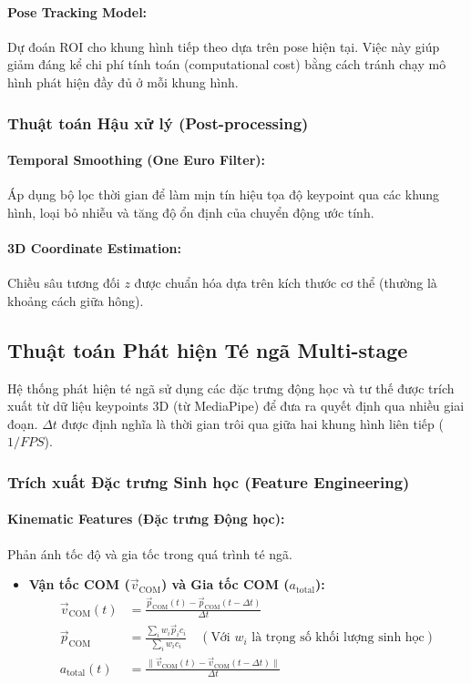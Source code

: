 \paragraph{Pose Tracking Model:} Dự đoán ROI cho khung hình tiếp theo dựa trên pose hiện tại. Việc này giúp giảm đáng kể chi phí tính toán (computational cost) bằng cách tránh chạy mô hình phát hiện đầy đủ ở mỗi khung hình.

\subsubsection{Thuật toán Hậu xử lý (Post-processing)}

\paragraph{Temporal Smoothing (One Euro Filter):} Áp dụng bộ lọc thời gian để làm mịn tín hiệu tọa độ keypoint qua các khung hình, loại bỏ nhiễu và tăng độ ổn định của chuyển động ước tính.

\paragraph{3D Coordinate Estimation:} Chiều sâu tương đối $z$ được chuẩn hóa dựa trên kích thước cơ thể (thường là khoảng cách giữa hông).

\subsection{Thuật toán Phát hiện Té ngã Multi-stage}

Hệ thống phát hiện té ngã sử dụng các đặc trưng động học và tư thế được trích xuất từ dữ liệu keypoints 3D (từ MediaPipe) để đưa ra quyết định qua nhiều giai đoạn. $\Delta t$ được định nghĩa là thời gian trôi qua giữa hai khung hình liên tiếp ($1/FPS$).

\subsubsection{Trích xuất Đặc trưng Sinh học (Feature Engineering)}

\paragraph{Kinematic Features (Đặc trưng Động học):} Phản ánh tốc độ và gia tốc trong quá trình té ngã.
\begin{itemize}
    \item \textbf{Vận tốc COM ($\vec{v}_{\text{COM}}$) và Gia tốc COM ($a_{\text{total}}$):}
    \begin{align}
    \vec{v}_{\text{COM}}(t) &= \frac{\vec{p}_{\text{COM}}(t) - \vec{p}_{\text{COM}}(t-\Delta t)}{\Delta t} \\
    \vec{p}_{\text{COM}} &= \frac{\sum_i w_i \vec{p}_i c_i}{\sum_i w_i c_i} \quad (\text{Với } w_i \text{ là trọng số khối lượng sinh học}) \\
    a_{\text{total}}(t) &= \frac{\|\vec{v}_{\text{COM}}(t) - \vec{v}_{\text{COM}}(t-\Delta t)\|}{\Delta t}
    \end{align}
\end{itemize}

